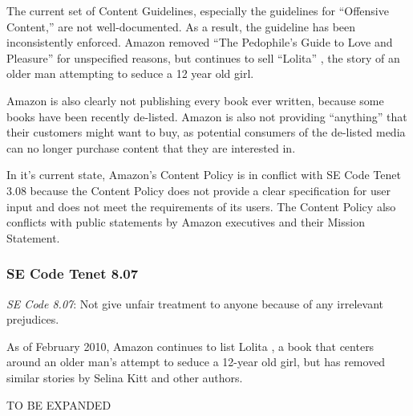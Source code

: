 \documentclass[11pt]{article}
\begin{document}
\begin{multicols}{2}
The current set of Content Guidelines, especially the guidelines for ``Offensive Content,'' are not well-documented.  As a result, the guideline has been inconsistently enforced.  Amazon removed ``The Pedophile's Guide to Love and Pleasure'' for unspecified reasons, but continues to sell ``Lolita'' \cite{AmazonLolitaDTPListing}, the story of an older man attempting to seduce a 12 year old girl. 

Amazon is also clearly not publishing every book ever written, because some books have been recently de-listed.  Amazon is also not providing ``anything'' that their customers might want to buy, as potential consumers of the de-listed media can no longer purchase content that they are interested in.

In it's current state, Amazon's Content Policy is in conflict with SE Code Tenet 3.08 because the Content Policy does not provide a clear specification for user input and does not meet the requirements of its users.  The Content Policy also conflicts with public statements by Amazon executives and their Mission Statement.

\subsubsection{SE Code Tenet 8.07}

\emph{SE Code 8.07}: Not give unfair treatment to anyone because of any irrelevant prejudices.

As of February 2010, Amazon continues to list Lolita \cite{AmazonLolitaDTPListing}, a book that centers around an older man's attempt to seduce a 12-year old girl, but has removed similar stories by Selina Kitt and other authors. \cite{KittSelfPubRevolution} 

TO BE EXPANDED






\end{multicols}
\end{document}
